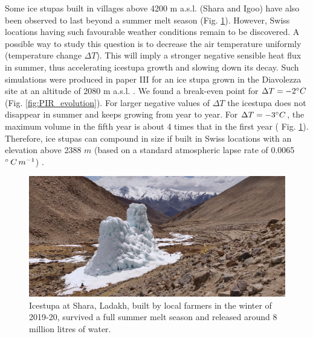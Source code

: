 Some ice stupas built in villages above 4200 m a.s.l. (Shara and Igoo) have also been observed to last beyond a
summer melt season (Fig. \ref{fig:PIR}). However, Swiss locations having such favourable weather conditions
remain to be discovered. A possible way to study this question is to decrease the air temperature uniformly
(temperature change $\Delta T$). This will imply a stronger negative sensible heat flux in summer, thus
accelerating icestupa growth and slowing down its decay. Such simulations were produced in paper III for an ice
stupa grown in the Diavolezza site at an altitude of 2080 m a.s.l. . We found a break-even point for $\Delta T = -2 ^{\circ}
C$ (Fig. \ref{fig:PIR_evolution}). For larger negative values of $\Delta T$ the icestupa does not disappear in
summer and keeps growing from year to year. For $\Delta T = -3 ^{\circ} C$, the maximum volume in the fifth year
is about 4 times that in the first year (  Fig. \ref{fig:PIR}). Therefore, ice stupas can compound in size if
built in Swiss locations with an elevation above 2388 $m$ (based on a standard atmospheric lapse rate of 0.0065
$^{\circ}\,C\,m^{-1}$) .

\begin{figure}[htb]
  \centering
	\includegraphics[width=\textwidth]{figs/PIR_example.jpg}

  \caption{Icestupa at Shara, Ladakh, built by local farmers in the winter of 2019-20, survived a full summer melt season and released
  around 8 million litres of water.} 

\label{fig:PIR} 
\end{figure}

